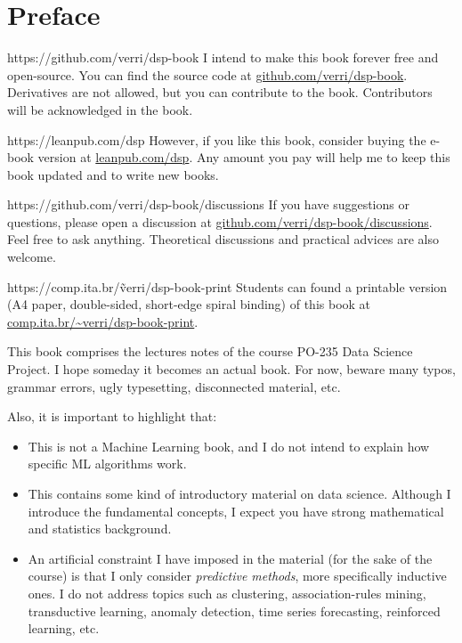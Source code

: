\chapter{Preface}

\begin{parwithqr}{https://github.com/verri/dsp-book}
  I intend to make this book forever free and open-source.  You can find the source code at
  \href{\aurl}{github.com/verri/dsp-book}.  Derivatives are not allowed, but you can
  contribute to the book.  Contributors will be acknowledged in the book.
\end{parwithqr}

\vfill

\begin{parwithqr}{https://leanpub.com/dsp}
  However, if you like this book, consider buying the e-book version at
  \href{\aurl}{leanpub.com/dsp}.  Any amount you pay will help me to keep this book
  updated and to write new books.
\end{parwithqr}

\vfill

\begin{parwithqr}{https://github.com/verri/dsp-book/discussions}
  If you have suggestions or questions, please open a discussion at
  \href{\aurl}{github.com/verri/dsp-book/discussions}.  Feel free to ask anything.
  Theoretical discussions and practical advices are also welcome.
\end{parwithqr}

\vfill

\begin{parwithqr}{https://comp.ita.br/\~verri/dsp-book-print}
  Students can found a printable version (A4 paper, double-sided, short-edge spiral
  binding) of this book at \href{\aurl}{comp.ita.br/\textasciitilde{}verri/dsp-book-print}.
\end{parwithqr}

\newpage
This book comprises the lectures notes of the course PO-235 Data Science Project.
I hope someday it becomes an actual book. For now, beware many typos, grammar errors, ugly
typesetting, disconnected material, etc.

Also, it is important to highlight that:
\begin{itemize}
  \item This is not a Machine Learning book, and I do not intend to explain how specific
    ML algorithms work.
  \item This contains some kind of introductory material on data science.  Although I
    introduce the fundamental concepts, I expect you have strong mathematical and
    statistics background.
  \item An artificial constraint I have imposed in the material (for the sake of the
    course) is that I only consider \emph{predictive methods}, more specifically
    inductive ones. I do not address topics such as clustering, association-rules
    mining, transductive learning, anomaly detection, time series forecasting, reinforced
    learning, etc.
\end{itemize}

